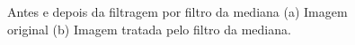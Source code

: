 \begin{figure}[H]
\centering
    \caption{\label{fig:orig_median} Antes e depois da filtragem por filtro da mediana (a) Imagem original (b) Imagem tratada pelo filtro da mediana.}

\end{figure}
